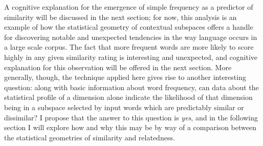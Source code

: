 


A cognitive explanation for the emergence of simple frequency as a predictor of similarity will be discussed in the next section; for now, this analysis is an example of how the statistical geometry of contextual subspaces offers a handle for discovering notable and unexpected tendencies in the way language occurs in a large scale corpus.  The fact that more frequent words are more likely to score highly in any given similarity rating is interesting and unexpected, and cognitive explanation for this observation will be offered in the next section.  More generally, though, the technique applied here gives rise to another interesting question: along with basic information about word frequency, can data about the statistical profile of a dimension alone indicate the likelihood of that dimension being in a subspace selected by input words which are predictably similar or dissimilar?  I propose that the answer to this question is \emph{yes}, and in the following section I will explore how and why this may be by way of a comparison between the statistical geometries of similarity and relatedness.

